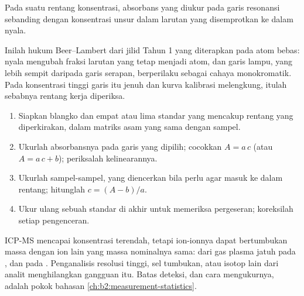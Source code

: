 \begin{proposition}\label{prop:b2:mass-spec-atomic:aas}
Pada suatu rentang konsentrasi, absorbans yang diukur pada garis resonansi
sebanding dengan konsentrasi unsur dalam larutan yang disemprotkan ke dalam
nyala.
\end{proposition}

\admitted

Inilah hukum Beer--Lambert dari jilid Tahun 1 yang diterapkan pada atom
bebas: nyala mengubah fraksi larutan yang tetap menjadi atom, dan garis
lampu, yang lebih sempit daripada garis serapan, berperilaku sebagai cahaya
monokromatik. Pada konsentrasi tinggi garis itu jenuh dan kurva kalibrasi
melengkung, itulah sebabnya rentang kerja diperiksa.

\begin{method}\label{met:b2:mass-spec-atomic:aas-calibration}
\begin{enumerate}
  \item Siapkan blangko dan empat atau lima standar yang mencakup rentang
        yang diperkirakan, dalam matriks asam yang sama dengan sampel.
  \item Ukurlah absorbansnya pada garis yang dipilih; cocokkan $A = a\,c$
        (atau $A = a\,c + b$); periksalah kelinearannya.
  \item Ukurlah sampel-sampel, yang diencerkan bila perlu agar masuk ke
        dalam rentang; hitunglah $c = (A - b)/a$.
  \item Ukur ulang sebuah standar di akhir untuk memeriksa pergeseran;
        koreksilah setiap pengenceran.
\end{enumerate}
\end{method}

ICP-MS mencapai konsentrasi terendah, tetapi ion-ionnya dapat bertumbukan
massa dengan ion lain yang massa nominalnya sama:  dari
gas plasma jatuh pada , dan  pada
. Penganalisis resolusi tinggi, sel tumbukan, atau isotop lain
dari analit menghilangkan gangguan itu. Batas deteksi, dan cara mengukurnya,
adalah pokok bahasan
\cref{ch:b2:measurement-statistics}.

